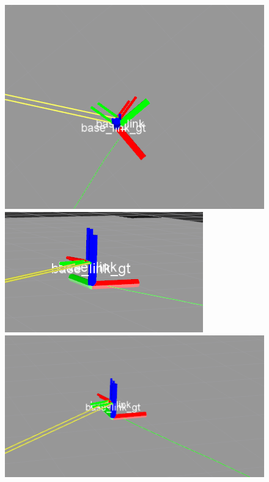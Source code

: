 \begin{figure}[h!]
  \includegraphics[width=\linewidth]{tp4_imagenes/informe_goal_bias_dificil_06_rviz1.png}
\endminipage\hfill
{}
  \includegraphics[width=\linewidth]{tp4_imagenes/informe_goal_bias_dificil_06_rviz2.png}
\endminipage\hfill
{}%
  \includegraphics[width=\linewidth]{tp4_imagenes/informe_goal_bias_dificil_06_rviz3.png}
\endminipage
\end{figure}



